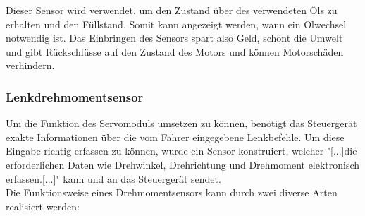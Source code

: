 			Dieser Sensor wird verwendet, um den Zustand über des verwendeten Öls zu erhalten und den Füllstand. Somit kann angezeigt werden, wann ein Ölwechsel notwendig ist. Das Einbringen des Sensors spart also Geld, schont die Umwelt und gibt Rückschlüsse auf den Zustand des Motors und können Motorschäden verhindern.\cite{TS_oel}

		
			\subsubsection{Lenkdrehmomentsensor}
				Um die Funktion des Servomoduls umsetzen zu können, benötigt das Steuergerät exakte Informationen über die vom Fahrer eingegebene Lenkbefehle. Um diese Eingabe richtig erfassen zu können, wurde ein Sensor konstruiert, welcher "[...]die erforderlichen Daten wie Drehwinkel, Drehrichtung und Drehmoment elektronisch erfassen.[...]"\cite{TS_dreh} kann und an das Steuergerät sendet.\\
				Die Funktionsweise eines Drehmomentsensors kann durch zwei diverse Arten realisiert werden:\\
				
